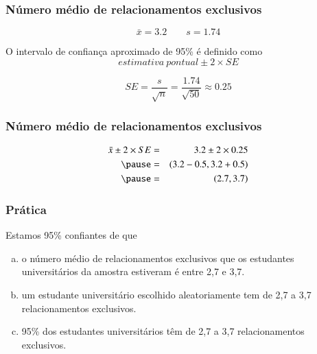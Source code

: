 
\begin{frame}
\frametitle{Número médio de relacionamentos exclusivos}
\justifying
{}

\pause 

\vspace{-0.5cm}
\[ \bar{x} = 3.2 \qquad s = 1.74 \]

\pause
\justifying
O intervalo de confiança aproximado de 95\% é definido como
\[ estimativa ~ pontual \pm 2 \times SE \]

\pause

\vspace{-0.25cm}
\[ SE = \frac{s}{\sqrt{n}} = \frac{1.74}{\sqrt{50}} \approx 0.25 \]

\end{frame}


\begin{frame}
\frametitle{Número médio de relacionamentos exclusivos}

\vspace{-0.25cm}
\begin{eqnarray*}
\bar{x} \pm 2 \times SE &=& 3.2 \pm 2 \times 0.25 \\
\pause
&=& (3.2 - 0.5, 3.2 + 0.5) \\
\pause
&=& (2.7, 3.7)
\end{eqnarray*}


\end{frame}


\begin{frame}
\frametitle{Prática}
\justifying
{}
\justifying
Estamos 95\% confiantes de que
\begin{enumerate}[(a)]
\justifying
\item o número médio de relacionamentos exclusivos que os estudantes universitários da amostra estiveram é entre 2,7 e 3,7.
\justifying
{}
\justifying
\item um estudante universitário escolhido aleatoriamente tem de 2,7 a 3,7 relacionamentos exclusivos.
\justifying
\item 95\% dos estudantes universitários têm de 2,7 a 3,7 relacionamentos exclusivos.
\end{enumerate}

\end{frame}

